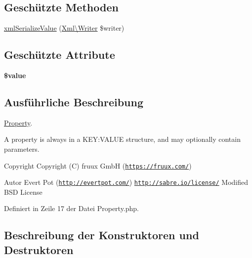 \subsection*{Geschützte Methoden}
\begin{DoxyCompactItemize}
\item 
\mbox{\hyperlink{class_sabre_1_1_v_object_1_1_property_a1f8599ce6c6362ddf5f037a187d2b15c}{xml\+Serialize\+Value}} (\mbox{\hyperlink{class_sabre_1_1_xml_1_1_writer}{Xml\textbackslash{}\+Writer}} \$writer)
\end{DoxyCompactItemize}
\subsection*{Geschützte Attribute}
\begin{DoxyCompactItemize}
\item 
\mbox{\label{class_sabre_1_1_v_object_1_1_property_a1c65557cbf1e4f020317e3347bdcfea3}} 
{\bfseries \$value}
\end{DoxyCompactItemize}


\subsection{Ausführliche Beschreibung}
\mbox{\hyperlink{class_sabre_1_1_v_object_1_1_property}{Property}}.

A property is always in a K\+EY\+:V\+A\+L\+UE structure, and may optionally contain parameters.

\begin{DoxyCopyright}{Copyright}
Copyright (C) fruux GmbH (\href{https://fruux.com/}{\tt https\+://fruux.\+com/}) 
\end{DoxyCopyright}
\begin{DoxyAuthor}{Autor}
Evert Pot (\href{http://evertpot.com/}{\tt http\+://evertpot.\+com/})  \href{http://sabre.io/license/}{\tt http\+://sabre.\+io/license/} Modified B\+SD License 
\end{DoxyAuthor}


Definiert in Zeile 17 der Datei Property.\+php.



\subsection{Beschreibung der Konstruktoren und Destruktoren}
\mbox{\label{class_sabre_1_1_v_object_1_1_property_a68ec843a9bf6b4708d58f0e11265c477}} 

